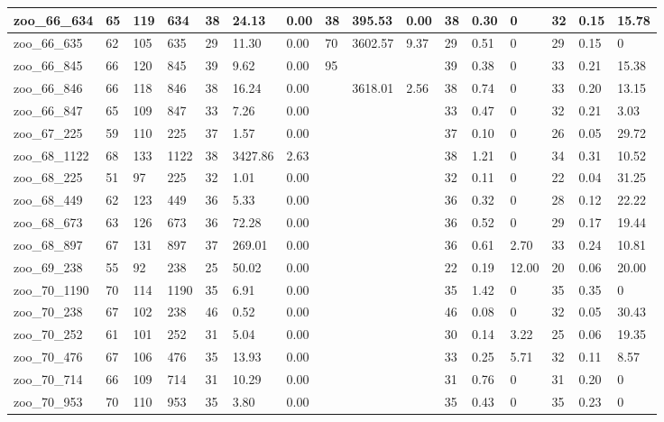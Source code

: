 \begin{landscape}
\begin{longtable}{llllllllllllllll}
zoo\_66\_634 & 65 & 119 & 634 & 38 & 24.13 & 0.00 & 38 & 395.53 & 0.00 & 38 & 0.30 & 0 & 32 & 0.15 & 15.78 \\ \hline 
zoo\_66\_635 & 62 & 105 & 635 & 29 & 11.30 & 0.00 & 70 & 3602.57 & 9.37 & 29 & 0.51 & 0 & 29 & 0.15 & 0 \\ \hline 
zoo\_66\_845 & 66 & 120 & 845 & 39 & 9.62 & 0.00 & 95 &  &  & 39 & 0.38 & 0 & 33 & 0.21 & 15.38 \\ \hline 
zoo\_66\_846 & 66 & 118 & 846 & 38 & 16.24 & 0.00 &  & 3618.01 & 2.56 & 38 & 0.74 & 0 & 33 & 0.20 & 13.15 \\ \hline 
zoo\_66\_847 & 65 & 109 & 847 & 33 & 7.26 & 0.00 &  &  &  & 33 & 0.47 & 0 & 32 & 0.21 & 3.03 \\ \hline 
zoo\_67\_225 & 59 & 110 & 225 & 37 & 1.57 & 0.00 &  &  &  & 37 & 0.10 & 0 & 26 & 0.05 & 29.72 \\ \hline 
zoo\_68\_1122 & 68 & 133 & 1122 & 38 & 3427.86 & 2.63 &  &  &  & 38 & 1.21 & 0 & 34 & 0.31 & 10.52 \\ \hline 
zoo\_68\_225 & 51 & 97 & 225 & 32 & 1.01 & 0.00 &  &  &  & 32 & 0.11 & 0 & 22 & 0.04 & 31.25 \\ \hline 
zoo\_68\_449 & 62 & 123 & 449 & 36 & 5.33 & 0.00 &  &  &  & 36 & 0.32 & 0 & 28 & 0.12 & 22.22 \\ \hline 
zoo\_68\_673 & 63 & 126 & 673 & 36 & 72.28 & 0.00 &  &  &  & 36 & 0.52 & 0 & 29 & 0.17 & 19.44 \\ \hline 
zoo\_68\_897 & 67 & 131 & 897 & 37 & 269.01 & 0.00 &  &  &  & 36 & 0.61 & 2.70 & 33 & 0.24 & 10.81 \\ \hline 
zoo\_69\_238 & 55 & 92 & 238 & 25 & 50.02 & 0.00 &  &  &  & 22 & 0.19 & 12.00 & 20 & 0.06 & 20.00 \\ \hline 
zoo\_70\_1190 & 70 & 114 & 1190 & 35 & 6.91 & 0.00 &  &  &  & 35 & 1.42 & 0 & 35 & 0.35 & 0 \\ \hline 
zoo\_70\_238 & 67 & 102 & 238 & 46 & 0.52 & 0.00 &  &  &  & 46 & 0.08 & 0 & 32 & 0.05 & 30.43 \\ \hline 
zoo\_70\_252 & 61 & 101 & 252 & 31 & 5.04 & 0.00 &  &  &  & 30 & 0.14 & 3.22 & 25 & 0.06 & 19.35 \\ \hline 
zoo\_70\_476 & 67 & 106 & 476 & 35 & 13.93 & 0.00 &  &  &  & 33 & 0.25 & 5.71 & 32 & 0.11 & 8.57 \\ \hline 
zoo\_70\_714 & 66 & 109 & 714 & 31 & 10.29 & 0.00 &  &  &  & 31 & 0.76 & 0 & 31 & 0.20 & 0 \\ \hline 
zoo\_70\_953 & 70 & 110 & 953 & 35 & 3.80 & 0.00 &  &  &  & 35 & 0.43 & 0 & 35 & 0.23 & 0 \\ \hline 

\end{longtable}
\end{landscape}
